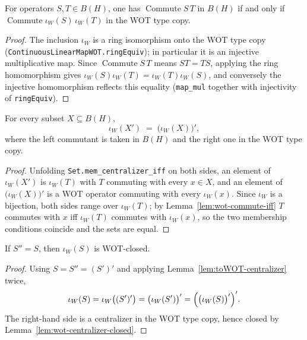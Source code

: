 \begin{lemma}
    \label{lem:wot-commute-iff}
    \leanok
    For operators $S, T \in B(H)$, one has $\operatorname{Commute} S\, T$ in
    $B(H)$ if and only if $\operatorname{Commute} \iota_W(S)\, \iota_W(T)$ in the
    WOT type copy.
\end{lemma}
\begin{proof}
    The inclusion $\iota_W$ is a ring isomorphism onto the WOT type copy
    (\texttt{ContinuousLinearMapWOT.ringEquiv}); in particular it is an injective
    multiplicative map. Since $\operatorname{Commute} S\, T$ means $S T = T S$,
    applying the ring homomorphism gives
    $\iota_W(S)\iota_W(T) = \iota_W(T)\iota_W(S)$, and conversely the injective
    homomorphism reflects this equality (\texttt{map\_mul} together with
    injectivity of \texttt{ringEquiv}).
\end{proof}

\begin{lemma}
    \label{lem:toWOT-centralizer}
    \leanok
    For every subset $X \subseteq B(H)$,
    \[
        \iota_W(X') \;=\; \bigl(\iota_W(X)\bigr)',
    \]
    where the left commutant is taken in $B(H)$ and the right one in the WOT type
    copy.
\end{lemma}
\begin{proof}
    Unfolding \texttt{Set.mem\_centralizer\_iff} on both sides, an element of
    $\iota_W(X')$ is $\iota_W(T)$ with $T$ commuting with every $x \in X$, and an
    element of $\bigl(\iota_W(X)\bigr)'$ is a WOT operator commuting with every
    $\iota_W(x)$. Since $\iota_W$ is a bijection, both sides range over
    $\iota_W(T)$; by Lemma~\ref{lem:wot-commute-iff} $T$ commutes with $x$ iff
    $\iota_W(T)$ commutes with $\iota_W(x)$, so the two membership conditions
    coincide and the sets are equal.
\end{proof}

\begin{lemma}
    \label{lem:dct-wot-closed}
    \leanok
    If $S'' = S$, then $\iota_W(S)$ is WOT-closed.
\end{lemma}
\begin{proof}
    Using $S = S'' = (S')'$ and applying
    Lemma~\ref{lem:toWOT-centralizer} twice,
    \[
        \iota_W(S) = \iota_W\bigl((S')'\bigr)
        = \bigl(\iota_W(S')\bigr)'
        = \Bigl(\bigl(\iota_W(S)\bigr)'\Bigr)'.
    \]
    The right-hand side is a centralizer in the WOT type copy, hence closed by
    Lemma~\ref{lem:wot-centralizer-closed}.
\end{proof}

